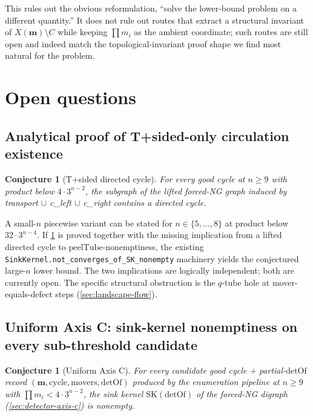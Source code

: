 \documentclass[11pt,a4paper]{article}
\theoremstyle{plain}
\newtheorem{conjecture}[theorem]{Conjecture}
\theoremstyle{definition}
\newcommand{\SK}{\mathrm{SK}}
\newcommand{\detOf}{\mathrm{detOf}}
\newcommand{\peelTube}{\mathrm{peelTube}}
\begin{document}
This rules out the obvious reformulation, ``solve the lower-bound
problem on a different quantity.''  It does not rule out routes that
extract a structural invariant of $X(\mathbf{m}) \setminus C$ while
keeping $\prod m_i$ as the ambient coordinate; such routes are still
open and indeed match the topological-invariant proof shape we find
most natural for the problem.

\section{Open questions}\label{sec:open}

\subsection{Analytical proof of T+sided-only circulation existence}\label{sec:open-tsided}

\begin{conjecture}[T+sided directed cycle]\label{conj:tsided}
For every good cycle at $n \ge 9$ with product below $4 \cdot 3^{n-2}$,
the subgraph of the lifted forced-NG graph induced by transport
$\cup$ c\_left $\cup$ c\_right contains a directed cycle.
\end{conjecture}
A small-$n$ piecewise variant can be stated for $n \in \{5, \ldots, 8\}$
at product below $32 \cdot 3^{n-4}$.  If \cref{conj:tsided} is proved
together with the missing implication from a lifted directed cycle to
$\peelTube$-nonemptiness, the existing
\texttt{SinkKernel.not\_converges\_of\_SK\_nonempty} machinery yields
the conjectured large-$n$ lower bound.  The two implications are
logically independent; both are currently open.  The specific structural
obstruction is the $q$-tube hole at mover-equals-defect steps
(\cref{sec:landscape-flow}).

\subsection{Uniform Axis C: sink-kernel nonemptiness on every sub-threshold candidate}\label{sec:open-axis-c}

\begin{conjecture}[Uniform Axis C]\label{conj:axis-c}
For every candidate good cycle + partial-$\detOf$ record
$(\mathbf{m}, \mathrm{cycle}, \mathrm{movers}, \detOf)$ produced by
the enumeration pipeline at $n \ge 9$ with $\prod m_i < 4 \cdot
3^{n-2}$, the sink kernel $\SK(\detOf)$ of the forced-NG digraph
(\cref{sec:detector-axis-c}) is nonempty.
\end{conjecture}
\end{document}
